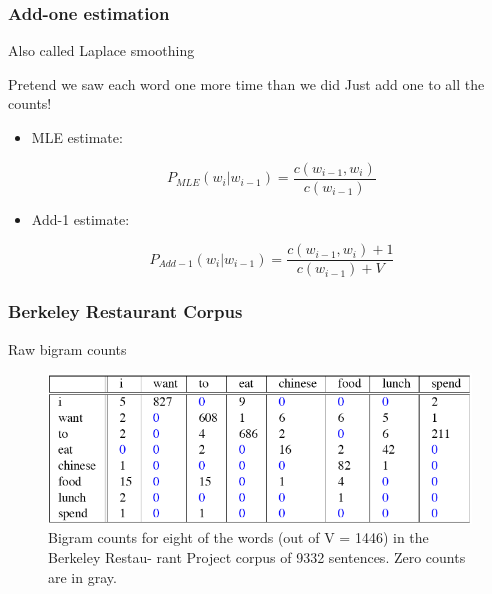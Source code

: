 \documentclass[13.5pt,aspecratio=169]{beamer}
\begin{document}
\begin{frame}
\onehalfspacing
	\frametitle{Add-one estimation}
	
    {\Large Also called Laplace smoothing}
    \begin{block}{}
        Pretend we saw each word one more time than we did
Just add one to all the counts!
    \end{block}
    \begin{itemize}
        \item MLE estimate:  
        \vspace{-2em}
        \begin{center} 
            \[ P_{MLE}(w_i | w_{i-1}) = \frac{c(w_{i-1}, w_i)}{c(w_{i-1})} \]
          \end{center}
        \item Add-1 estimate:
        \vspace{-2em}
        \begin{center} 
            \[ P_{Add-1}(w_i | w_{i-1}) = \frac{c(w_{i-1}, w_i) + 1}{c(w_{i-1}) + V} \]
          \end{center}
    \end{itemize}
\end{frame}

\begin{frame}
    \onehalfspacing
        \frametitle{Berkeley Restaurant Corpus}
        \begin{minipage}{0.3\textwidth}
            \begin{block}{}
                Raw bigram counts
            \end{block}
        \end{minipage}
        
        \bigskip
            \begin{figure}
                \centering
                \includegraphics [scale=0.6] {raw_bigram_counts.png}
                \caption{Bigram counts for eight of the words (out of V = 1446) in the Berkeley Restau-
                rant Project corpus of 9332 sentences. Zero counts are in gray.}
            \end{figure}
        
\end{frame}
\end{document}

